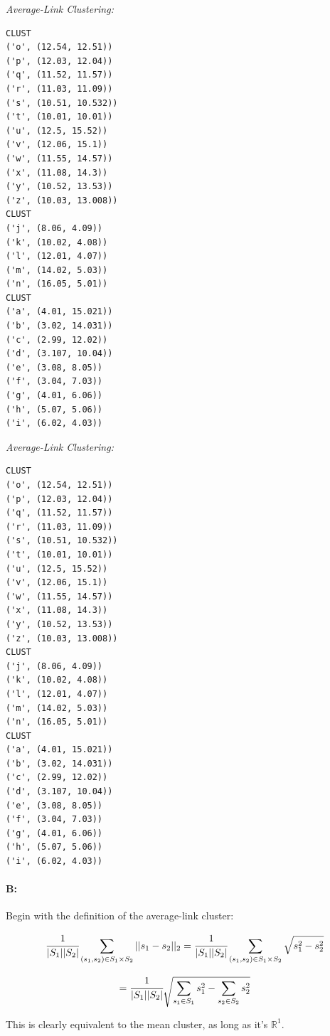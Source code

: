 \documentclass[11pt]{article}
\begin{document}
\textit{Average-Link Clustering:}
\begin{verbatim}
CLUST
('o', (12.54, 12.51))
('p', (12.03, 12.04))
('q', (11.52, 11.57))
('r', (11.03, 11.09))
('s', (10.51, 10.532))
('t', (10.01, 10.01))
('u', (12.5, 15.52))
('v', (12.06, 15.1))
('w', (11.55, 14.57))
('x', (11.08, 14.3))
('y', (10.52, 13.53))
('z', (10.03, 13.008))
CLUST
('j', (8.06, 4.09))
('k', (10.02, 4.08))
('l', (12.01, 4.07))
('m', (14.02, 5.03))
('n', (16.05, 5.01))
CLUST
('a', (4.01, 15.021))
('b', (3.02, 14.031))
('c', (2.99, 12.02))
('d', (3.107, 10.04))
('e', (3.08, 8.05))
('f', (3.04, 7.03))
('g', (4.01, 6.06))
('h', (5.07, 5.06))
('i', (6.02, 4.03))

\end{verbatim}

\textit{Average-Link Clustering:}
\begin{verbatim}
CLUST
('o', (12.54, 12.51))
('p', (12.03, 12.04))
('q', (11.52, 11.57))
('r', (11.03, 11.09))
('s', (10.51, 10.532))
('t', (10.01, 10.01))
('u', (12.5, 15.52))
('v', (12.06, 15.1))
('w', (11.55, 14.57))
('x', (11.08, 14.3))
('y', (10.52, 13.53))
('z', (10.03, 13.008))
CLUST
('j', (8.06, 4.09))
('k', (10.02, 4.08))
('l', (12.01, 4.07))
('m', (14.02, 5.03))
('n', (16.05, 5.01))
CLUST
('a', (4.01, 15.021))
('b', (3.02, 14.031))
('c', (2.99, 12.02))
('d', (3.107, 10.04))
('e', (3.08, 8.05))
('f', (3.04, 7.03))
('g', (4.01, 6.06))
('h', (5.07, 5.06))
('i', (6.02, 4.03))
\end{verbatim}


\paragraph{B: }

Begin with the definition of the average-link cluster:

\begin{equation}
\cfrac{1}{|S_1||S_2|} \sum_{(s_1,s_2) \in S_1 \times S_2} || s_1 - s_2||_2 = \cfrac{1}{|S_1||S_2|} \sum_{(s_1,s_2) \in S_1 \times S_2} \sqrt{s_1^2 - s_2^2}
\end{equation}

\begin{equation}
= \cfrac{1}{|S_1||S_2|} \sqrt{\sum_{s_1 \in S_1} s_1^2 - \sum_{s_2 \in S_2} s_2^2}
\end{equation}

This is clearly equivalent to the mean cluster, as long as it's $\mathbb{R}^1$.
\end{document}
